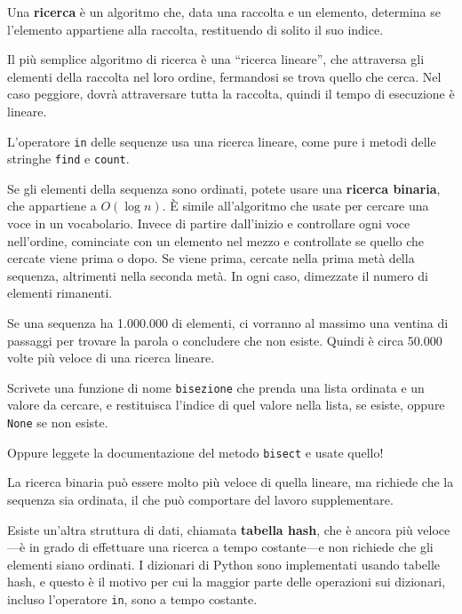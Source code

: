 \documentclass[10pt]{book}
\begin{document}
Una {\bf ricerca} è un algoritmo che, data una raccolta e un elemento, determina se l'elemento appartiene alla raccolta, restituendo di solito il suo indice.

Il più semplice algoritmo di ricerca è una ``ricerca lineare'', che attraversa gli elementi della raccolta nel loro ordine, fermandosi se trova quello che cerca. Nel caso peggiore, dovrà attraversare tutta la raccolta, quindi il tempo di esecuzione è lineare.

L'operatore {\tt in} delle sequenze usa una ricerca lineare, come pure i metodi delle stringhe {\tt find} e {\tt count}.

Se gli elementi della sequenza sono ordinati, potete usare una {\bf ricerca binaria}, che appartiene a $O(\log n)$.  È simile all'algoritmo che usate per cercare una voce in un vocabolario. Invece di partire dall'inizio e controllare ogni voce nell'ordine, cominciate con un elemento nel mezzo e controllate se quello che cercate viene prima o dopo. Se viene prima, cercate nella prima metà della sequenza, altrimenti nella seconda metà. In ogni caso, dimezzate il numero di elementi rimanenti.

Se una sequenza ha 1.000.000 di elementi, ci vorranno al massimo una ventina di passaggi per trovare la parola o concludere che non esiste. Quindi è circa 50.000 volte più veloce di una ricerca lineare.

\vspace{0.2in}
\begin{exercise}

Scrivete una funzione di nome {\tt bisezione} che prenda una lista ordinata e un valore da cercare, e restituisca l'indice di quel valore nella lista, se esiste, oppure {\tt None} se non esiste.

Oppure leggete la documentazione del metodo {\tt bisect} e usate quello!

\end{exercise}

La ricerca binaria può essere molto più veloce di quella lineare, ma richiede che la sequenza sia ordinata, il che può comportare del lavoro supplementare.

Esiste un'altra struttura di dati, chiamata {\bf tabella hash}, che è ancora più veloce---è in grado di effettuare una ricerca a tempo costante---e non richiede che gli elementi siano ordinati. I dizionari di Python sono implementati usando tabelle hash, e questo è il motivo per cui la maggior parte delle operazioni sui dizionari, incluso l'operatore {\tt in}, sono a tempo costante.
\end{document}
